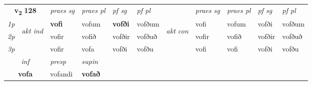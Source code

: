 \noindent
\begin{tabular}{lllllllllll} \toprule
\multicolumn{2}{c}{\textbf{v{\textsubscript{2}}} \Large{\textbf{128}}}  &  \textit{praes sg}  & \textit{praes pl}  &\textit{ pf sg} & \textit{pf pl} &  &  \textit{praes sg}  & \textit{praes pl}  & \textit{pf sg} & \textit{pf pl } \\*
	\cmidrule{3-6} \cmidrule{8-11}
 {\textit{1p}} & \multirow{3}{*}{\begin{turn}{90}\textit{akt ind}\end{turn}} & \textbf{vofi} & vofum & \textbf{vofði} & vofðum & \multirow{3}{*}{\begin{turn}{90}\textit{akt con}\end{turn}} &vofi & vofum & vofði & vofðum\\*
 {\textit{2p}} &  &  vofir  & vofið & vofðir & vofðuð & & vofir & vofið & vofðir & vofðuð \\*
{\textit{3p}} &  & vofir & vofa & vofði & vofðu & & vofi & vofi& vofði & vofðu \\*
\cmidrule{3-6} \cmidrule{8-11}

   \multicolumn{2}{c}{\textit{inf}}     & \textit{presp} & \textit{supin}   \\*
  \multicolumn{2}{c}{\textbf{vofa}}      & vofandi &  \textbf{vofað}   \\*
\end{tabular}

